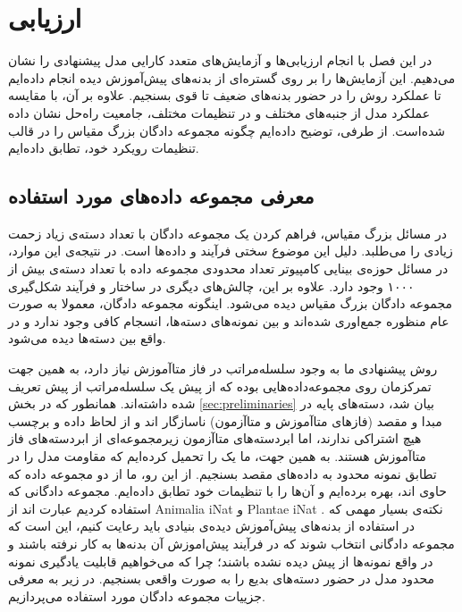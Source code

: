 \chapter{ارزیابی }\label{Chap:Chap4}
\minitoc
\setcounter{footnote}{0}
\pagestyle{plain}

در این فصل با انجام ارزیابی‌ها و آزمایش‌های متعدد کارایی مدل پیشنهادی را نشان می‌دهیم. این آزمایش‌ها را بر روی گستره‌ای از بدنه‌های پیش‌آموزش دیده انجام داده‌ایم تا عملکرد روش را در حضور بدنه‌های ضعیف تا قوی بسنجیم. علاوه بر آن، با مقایسه عملکرد مدل از جنبه‌های مختلف و در تنظیمات مختلف، جامعیت راه‌حل نشان داده شده‌است. از طرفی، توضیح داده‌ایم چگونه مجموعه دادگان بزرگ مقیاس را در قالب تنظیمات رویکرد خود، تطابق داده‌ایم.

\section{معرفی مجموعه داده‌های مورد استفاده} \label{sec:dataset}

در مسائل بزرگ مقیاس، فراهم کردن یک مجموعه دادگان با تعداد دسته‌ی زیاد زحمت زیادی را می‌طلبد. دلیل این موضوع سختی فرآیند 
و
 داده‌ها است. در نتیجه‌ی این موارد، در مسائل حوزه‌ی بینایی کامپیوتر تعداد محدودی مجموعه داده با تعداد دسته‌ی بیش از ۱۰۰۰ وجود دارد. علاوه بر این، چالش‌های دیگری در ساختار و فرآیند شکل‌گیری مجموعه دادگان بزرگ مقیاس دیده می‌شود. اینگونه مجموعه دادگان، معمولا به صورت عام منظوره جمع‌اوری شده‌اند و بین نمونه‌های دسته‌ها، انسجام کافی وجود ندارد و در واقع بین دسته‌ها
  دیده می‌شود. 
  
  روش پیشنهادی ما به وجود سلسله‌مراتب در فاز متاآموزش نیاز دارد، به همین جهت تمرکزمان روی مجموعه‌داده‌هایی بوده که از پیش یک سلسله‌مراتب از پیش تعریف شده داشته‌اند. همانطور که در بخش 
  \ref{sec:preliminaries}
  بیان شد، دسته‌های پایه در مبدا و مقصد (فازهای متاآموزش و متاآزمون) ناسازگار اند و از لحاظ داده و برچسب هیچ اشتراکی ندارند، اما ابردسته‌های متاآزمون زیرمجموعه‌ای از ابردسته‌های فاز متاآموزش هستند. به همین جهت، ما یک
   را تحمیل کرده‌ایم که مقاومت مدل را در تطابق نمونه محدود به داده‌های مقصد بسنجیم. 
  از این رو، ما از دو مجموعه داده‌ که حاوی
   اند، بهره برده‌ایم و آن‌ها را با تنظیمات خود تطابق داده‌ایم. مجموعه‌ دادگانی که استفاده کردیم عبارت اند از 
   Animalia iNat 
   و
   Plantae iNat 
   \cite{inat}
   .
   نکته‌ی بسیار مهمی که در استفاده از بدنه‌های پیش‌آموزش دیده‌ی بنیادی باید رعایت کنیم، این است که مجموعه دادگانی انتخاب شوند که در فرآیند پیش‌اموزش آن بدنه‌ها به کار نرفته باشند و در واقع نمونه‌ها از پیش دیده نشده باشند؛ چرا که می‌خواهیم قابلیت یادگیری نمونه محدود مدل در حضور دسته‌های بدیع را به صورت واقعی بسنجیم. در زیر به معرفی جزییات مجموعه دادگان مورد استفاده می‌پردازیم.
   
